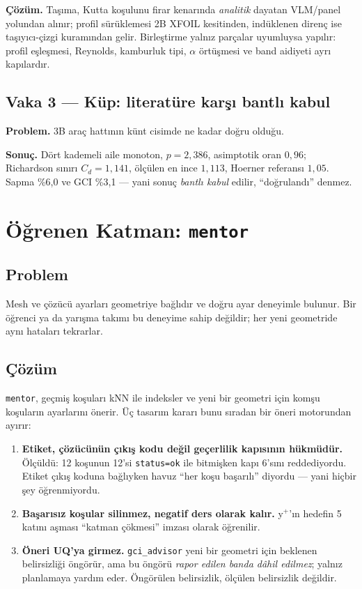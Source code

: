 \documentclass[11pt,a4paper]{article}
\begin{document}
\textbf{Çözüm.} Taşıma, Kutta koşulunu firar kenarında \emph{analitik} dayatan
VLM/panel yolundan alınır; profil sürüklemesi 2B XFOIL kesitinden, indüklenen
direnç ise taşıyıcı-çizgi kuramından gelir. Birleştirme yalnız parçalar uyumluysa
yapılır: profil eşleşmesi, Reynolds, kamburluk tipi, $\alpha$ örtüşmesi ve
band aidiyeti ayrı kapılardır.

\subsection{Vaka 3 --- Küp: literatüre karşı bantlı kabul}

\textbf{Problem.} 3B araç hattının künt cisimde ne kadar doğru olduğu.

\textbf{Sonuç.} Dört kademeli aile monoton, $p=2{,}386$, asimptotik oran
$0{,}96$; Richardson sınırı $C_d=1{,}141$, ölçülen en ince $1{,}113$, Hoerner
referansı $1{,}05$. Sapma \%6{,}0 ve GCI \%3{,}1 --- yani sonuç
\emph{bantlı kabul} edilir, ``doğrulandı'' denmez.

\section{Öğrenen Katman: \texttt{mentor}}
\label{sec:mentor}

\subsection*{Problem}

Mesh ve çözücü ayarları geometriye bağlıdır ve doğru ayar deneyimle bulunur.
Bir öğrenci ya da yarışma takımı bu deneyime sahip değildir; her yeni geometride
aynı hataları tekrarlar.

\subsection*{Çözüm}

\texttt{mentor}, geçmiş koşuları kNN ile indeksler ve yeni bir geometri için
komşu koşuların ayarlarını önerir. Üç tasarım kararı bunu sıradan bir
öneri motorundan ayırır:

\begin{enumerate}\setlength\itemsep{1pt}
  \item \textbf{Etiket, çözücünün çıkış kodu değil geçerlilik kapısının
        hükmüdür.} Ölçüldü: 12 koşunun 12'si \texttt{status=ok} ile bitmişken
        kapı 6'sını reddediyordu. Etiket çıkış koduna bağlıyken havuz
        ``her koşu başarılı'' diyordu --- yani hiçbir şey öğrenmiyordu.
  \item \textbf{Başarısız koşular silinmez, negatif ders olarak kalır.}
        y$^+$'ın hedefin 5 katını aşması ``katman çökmesi'' imzası olarak
        öğrenilir.
  \item \textbf{Öneri UQ'ya girmez.} \texttt{gci\_advisor} yeni bir geometri
        için beklenen belirsizliği öngörür, ama bu öngörü \emph{rapor edilen
        banda dâhil edilmez}; yalnız planlamaya yardım eder. Öngörülen
        belirsizlik, ölçülen belirsizlik değildir.
\end{enumerate}
\end{document}
